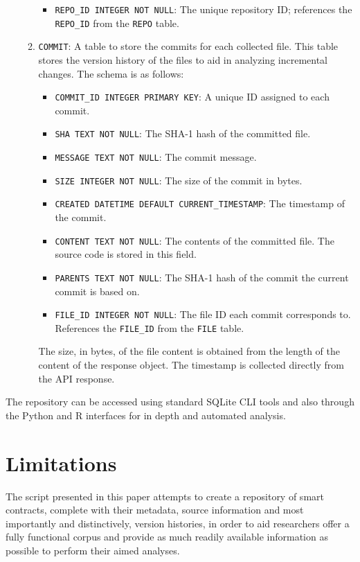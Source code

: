 \documentclass[10pt,conference]{IEEEtran}
\begin{document}
\begin{itemize}
\begin{enumerate}
\begin{itemize}
				\item \texttt{REPO\_ID INTEGER NOT NULL}: The unique repository ID; references the \texttt{REPO\_ID} from the \texttt{REPO} table.
			\end{itemize}
			\item \texttt{COMMIT}: A table to store the commits for each collected file. This table stores the version history of the files to aid in analyzing incremental changes. The schema is as follows:
			\begin{itemize}
				\item \texttt{COMMIT\_ID INTEGER PRIMARY KEY}: A unique ID assigned to each commit.
				\item \texttt{SHA TEXT NOT NULL}: The SHA-1 hash of the committed file.
				\item \texttt{MESSAGE TEXT NOT NULL}: The commit message.
				\item \texttt{SIZE INTEGER NOT NULL}: The size of the commit in bytes.
				\item \texttt{CREATED DATETIME DEFAULT CURRENT\_TIMESTAMP}: The timestamp of the commit.
				\item \texttt{CONTENT TEXT NOT NULL}: The contents of the committed file. The source code is stored in this field.
				\item \texttt{PARENTS TEXT NOT NULL}: The SHA-1 hash of the commit the current commit is based on.
				\item \texttt{FILE\_ID INTEGER NOT NULL}: The file ID each commit corresponds to. References the \texttt{FILE\_ID} from the \texttt{FILE} table.
			\end{itemize}
			The size, in bytes, of the file content is obtained from the length of the content of the response object. The timestamp is collected directly from the API response.
		\end{enumerate}
		
	\end{itemize}
	
	The repository can be accessed using standard SQLite CLI tools and also through the Python and R interfaces for in depth and automated analysis.
	
	\section{Limitations}
	\label{sec:limitations}
	The script presented in this paper attempts to create a repository of smart contracts, complete with their metadata, source information and most importantly and distinctively, version histories, in order to aid researchers offer a fully functional corpus and provide as much readily available information as possible to perform their aimed analyses. 
	
\end{document}
